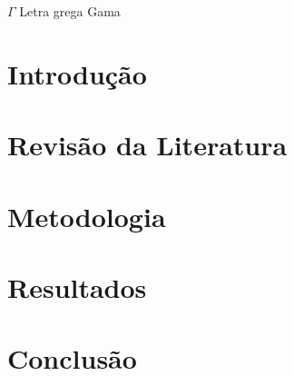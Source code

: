 \documentclass[12pt, a4paper,
 chapter=TITLE,
  section=TITLE,
   subsection=TITLE,
    subsubsection=TITLE]{abntex2}
\begin{document}
	
	\newpage
	
	\listoffigures
	
	\newpage
	
	\listoftables
	
	\newpage
	
	\begin{simbolos}
		\item[$ \Gamma $] Letra grega Gama
	\end{simbolos}
	
	
	\tableofcontents
	
	
	\textual
	
	\chapter{Introdução}
		\lipsum[1-2]
		
	
	\chapter{Revisão da Literatura}
	

	
	\chapter{Metodologia}
		\lipsum[1-2]
		

	
	\chapter{Resultados}
	

	
	\chapter{Conclusão}
		\lipsum[1]
		
		
	
		
\end{document}
